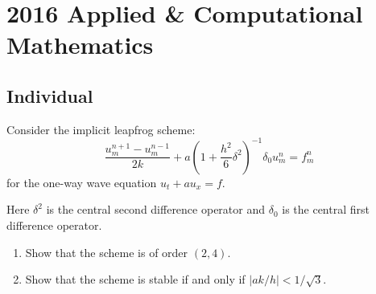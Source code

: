 \section{2016 Applied \& Computational Mathematics}

\subsection{Individual}

\begin{exercise}
\label{applied:2016:1}
Consider the implicit leapfrog scheme:
\[
\frac{u_{m}^{n+1}-u_{m}^{n-1}}{2k}+a\left(1+\frac{h^{2}}{6}\delta^{2}\right)^{-1}\delta_{0}u_{m}^{n}=f_{m}^{n}
\]
for the one-way wave equation $u_{t}+au_{x}=f$.

Here $\delta^{2}$ is the central second difference operator and $\delta_{0}$ is the central first difference operator.

\begin{enumerate}
\item Show that the scheme is of order $(2,4)$.
\item Show that the scheme is stable if and only if $|ak/h|<1/\sqrt{3}$.
\end{enumerate}
\end{exercise}

